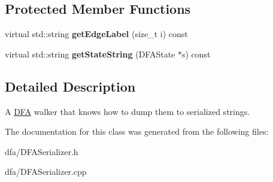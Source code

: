 \subsection*{Protected Member Functions}
\begin{DoxyCompactItemize}
\item 
\mbox{\label{classantlr4_1_1dfa_1_1DFASerializer_a93719dde2778b820567b40726e896610}} 
virtual std\+::string {\bfseries get\+Edge\+Label} (size\+\_\+t i) const
\item 
\mbox{\label{classantlr4_1_1dfa_1_1DFASerializer_acc1d210c8d845dbc2ecf21c497ecbfaa}} 
virtual std\+::string {\bfseries get\+State\+String} (D\+F\+A\+State $\ast$s) const
\end{DoxyCompactItemize}


\subsection{Detailed Description}
A \hyperlink{classantlr4_1_1dfa_1_1DFA}{D\+FA} walker that knows how to dump them to serialized strings. 

The documentation for this class was generated from the following files\+:\begin{DoxyCompactItemize}
\item 
dfa/D\+F\+A\+Serializer.\+h\item 
dfa/D\+F\+A\+Serializer.\+cpp\end{DoxyCompactItemize}
